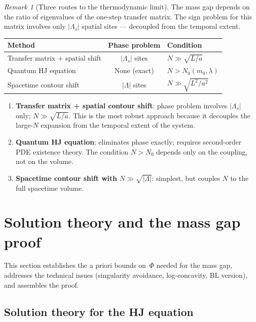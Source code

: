 \documentclass[12pt]{article}
\theoremstyle{definition}
\theoremstyle{remark}
\newtheorem{remark}[theorem]{Remark}
\newcommand{\La}{\Lambda}
\begin{document}
\begin{remark}[Three routes to the thermodynamic limit]
\label{rem:three_routes}
The mass gap depends on the ratio of eigenvalues of the
one-step transfer matrix. The sign problem for this matrix
involves only $|\La_s|$ spatial sites --- decoupled from
the temporal extent.

\medskip\noindent
\begin{tabular}{|l|c|l|}
\hline
\textbf{Method} & \textbf{Phase problem} & \textbf{Condition} \\
\hline
Transfer matrix + spatial shift & $|\La_s|$ sites
  & $N \gg \sqrt{L/a}$ \\
Quantum HJ equation & None (exact) & $N > N_0(m_0,\lambda)$ \\
Spacetime contour shift & $|\La|$ sites & $N \gg \sqrt{L^2/a^2}$ \\
\hline
\end{tabular}

\medskip
\begin{enumerate}
\item[(a)] \textbf{Transfer matrix + spatial contour shift}:
  phase problem involves $|\La_s|$ only; $N \gg \sqrt{L/a}$.
  This is the most robust approach because it decouples the
  large-$N$ expansion from the temporal extent of the system.
\item[(b)] \textbf{Quantum HJ equation}: eliminates phase
  exactly; requires second-order PDE existence theory.
  The condition $N > N_0$ depends only on the coupling, not
  on the volume.
\item[(c)] \textbf{Spacetime contour shift with}
  $N \gg \sqrt{|\La|}$: simplest, but couples $N$ to the
  full spacetime volume.
\end{enumerate}
\end{remark}

\section{Solution theory and the mass gap proof}
\label{sec:HJ_solution}

This section establishes the a priori bounds on~$\Phi$ needed for
the mass gap, addresses the technical issues (singularity avoidance,
log-concavity, BL version), and assembles the proof.

\subsection{Solution theory for the HJ equation}
\end{document}
